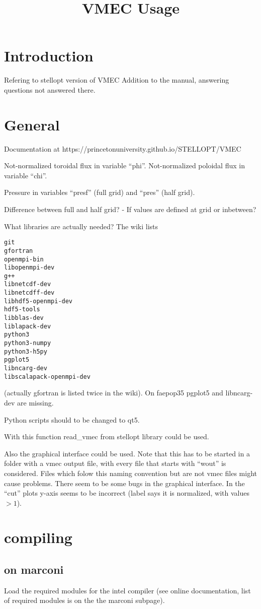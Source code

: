 \documentclass{article}
\title{\textbf{VMEC Usage}}
\begin{document}
\maketitle

\section{Introduction}
Refering to stellopt version of VMEC
Addition to the manual, answering questions not answered there.


\section{General}
Documentation at https://princetonuniversity.github.io/STELLOPT/VMEC

Not-normalized toroidal flux in variable ``phi''.
Not-normalized poloidal flux in variable ``chi''.

Pressure in variables ``presf'' (full grid) and ``pres'' (half grid).

Difference between full and half grid?
- If values are defined at grid or inbetween?

What libraries are actually needed?
The wiki lists
\begin{verbatim}
git
gfortran
openmpi-bin
libopenmpi-dev
g++
libnetcdf-dev
libnetcdff-dev
libhdf5-openmpi-dev
hdf5-tools
libblas-dev
liblapack-dev
python3
python3-numpy
python3-h5py
pgplot5
libncarg-dev
libscalapack-openmpi-dev
\end{verbatim}
(actually gfortran is listed twice in the wiki).
On faepop35 pgplot5 and libncarg-dev are missing.

Python scripts should to be changed to qt5.

With this function read\_vmec from stellopt library could be used.

Also the graphical interface could be used. Note that this has to be
started in a folder with a vmec output file, with every file that starts
with ``wout'' is considered. Files which folow this naming convention but
are not vmec files might cause problems.
There seem to be some bugs in the graphical interface. In the ``cut''
plots y-axis seems to be incorrect (label says it is normalized, with
values $> 1$).


\section{compiling}

\subsection{on marconi}
Load the required modules for the intel compiler (see online
documentation, list of required modules is on the the marconi subpage).
\end{document}
